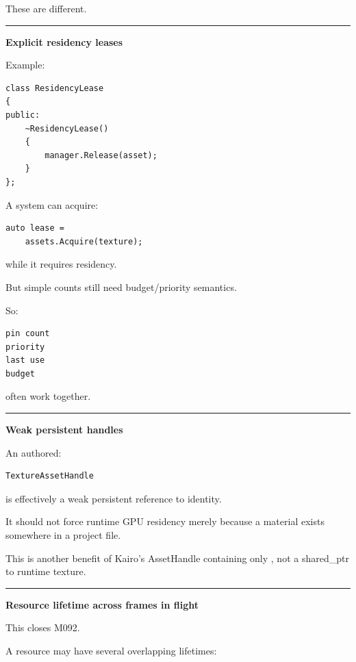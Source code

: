 These are different.

\begin{center}\rule{0.5\linewidth}{0.5pt}\end{center}

\textbf{Explicit residency leases}

Example:

\begin{verbatim}
class ResidencyLease
{
public:
    ~ResidencyLease()
    {
        manager.Release(asset);
    }
};
\end{verbatim}

A system can acquire:

\begin{verbatim}
auto lease =
    assets.Acquire(texture);
\end{verbatim}

while it requires residency.

But simple counts still need budget/priority semantics.

So:

\begin{verbatim}
pin count
priority
last use
budget
\end{verbatim}

often work together.

\begin{center}\rule{0.5\linewidth}{0.5pt}\end{center}

\textbf{Weak persistent handles}

An authored:

\begin{verbatim}
TextureAssetHandle
\end{verbatim}

is effectively a weak persistent reference to identity.

It should not force runtime GPU residency merely because a material exists somewhere in a project file.

This is another benefit of Kairo's AssetHandle containing only , not a shared\_ptr to runtime texture.

\begin{center}\rule{0.5\linewidth}{0.5pt}\end{center}

\textbf{Resource lifetime across frames in flight}

This closes M092.

A resource may have several overlapping lifetimes:

